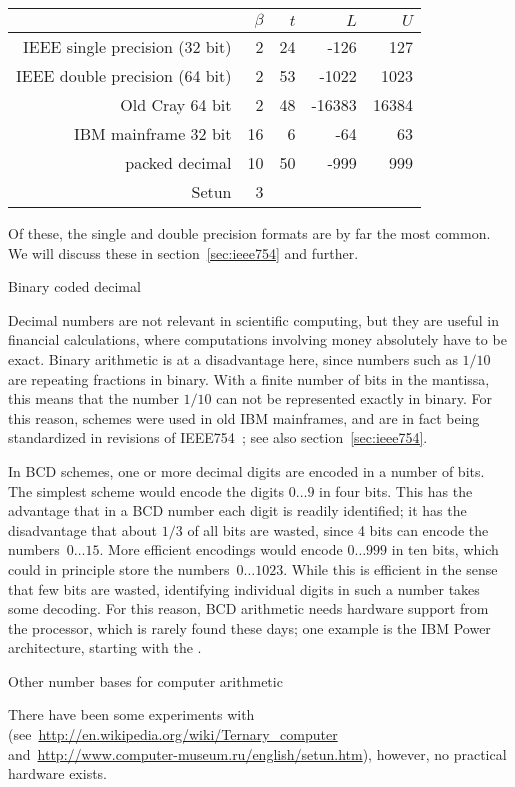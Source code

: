\begin{tabular}{r|r|r|r|r}
  &$\beta$&$t$&$L$&$U$\\ \hline
  IEEE single precision (32 bit)&2&24&-126&127\\
  IEEE double precision (64 bit)&2&53&-1022&1023\\
  Old Cray 64 bit&2&48&-16383&16384\\
  IBM mainframe 32 bit&16&6&-64&63\\
  packed decimal&10&50&-999&999\\
  Setun&3
\end{tabular}

Of these, the single and double precision formats are by far the most
common. We will discuss these in section~\ref{sec:ieee754} and
further.

 {Binary coded decimal}

Decimal numbers are not relevant in scientific computing, but they are
useful in financial calculations, where computations involving money
absolutely have to be exact. Binary arithmetic is at a disadvantage
here, since numbers such as $1/10$ are repeating fractions in
binary. With a finite number of bits in the mantissa,
this means that the number $1/10$ can not be represented exactly in
binary.  For this reason,  schemes
were used in old IBM mainframes, and are in fact being
standardized in revisions of IEEE754~\cite{ieee754-webpage}; see also
section~\ref{sec:ieee754}.

In BCD schemes, one or more decimal digits are encoded in a number of
bits. The simplest scheme would encode the digits $0\ldots9$ in four
bits. This has the advantage that in a
BCD number each digit is readily identified; it has the disadvantage
that about $1/3$ of all bits are wasted, since 4 bits can
encode the numbers~$0\ldots15$.
%
More efficient encodings would encode $0\ldots999$ in ten bits, which
could in principle store the numbers~$0\ldots1023$. While this is
efficient in the sense that few bits are wasted, identifying
individual digits in such a number takes some decoding. For this
reason, BCD arithmetic needs hardware support from the processor,
which is rarely found these days; one example is the IBM
Power architecture, starting with the .

 {Other number bases for computer arithmetic}

There have been some experiments with 
(see~\url{http://en.wikipedia.org/wiki/Ternary_computer}
and~\url{http://www.computer-museum.ru/english/setun.htm}), however,
no practical hardware exists.

